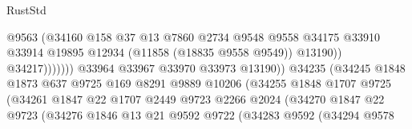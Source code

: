 \begin{lexlean}{RustStd}
\begin{coremodule}
                                                @9563
                                                (@34160
                                                  @158
                                                  @37
                                                  @13
                                                  @7860
                                                  @2734
                                                  @9548
                                                  @9558
                                                  @34175
                                                  @33910
                                                  @33914
                                                  @19895
                                                  @12934
                                                  (@11858 (@18835 @9558 @9549))
                                                  @13190))
                                              @34217)))))))
                                @33964
                                @33967
                                @33970
                                @33973
                                @13190))
                            @34235
                            (@34245
                              @1848
                              @1873
                              @637
                              @9725
                              @169
                              @8291
                              @9889
                              @10206
                              (@34255
                                @1848
                                @1707
                                @9725
                                (@34261
                                  @1847
                                  @22
                                  @1707
                                  @2449
                                  @9723
                                  @2266
                                  @2024
                                  (@34270
                                    @1847
                                    @22
                                    @9723
                                    (@34276
                                      @1846
                                      @13
                                      @21
                                      @9592
                                      @9722
                                      (@34283
                                        @9592
                                        (@34294
                                          @9578

\end{coremodule}
\end{lexlean}
